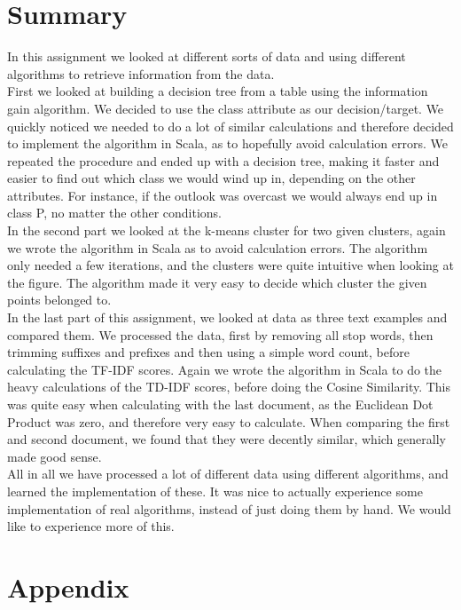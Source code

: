 \documentclass{article}
\theoremstyle{remark}
\begin{document}
	\section{Summary}
	In this assignment we looked at different sorts of data and using different algorithms to retrieve information from the data. \\
	First we looked at building a decision tree from a table using the information gain algorithm. We decided to use the class attribute as our decision/target. We quickly noticed we needed to do a lot of similar calculations and therefore decided to implement the algorithm in Scala, as to hopefully avoid calculation errors. We repeated the procedure and ended up with a decision tree, making it faster and easier to find out which class we would wind up in, depending on the other attributes. For instance, if the outlook was overcast we would always end up in class P, no matter the other conditions. \\
	In the second part we looked at the k-means cluster for two given clusters, again we wrote the algorithm in Scala as to avoid calculation errors. The algorithm only needed a few iterations, and the clusters were quite intuitive when looking at the figure. The algorithm made it very easy to decide which cluster the given points belonged to. \\
	In the last part of this assignment, we looked at data as three text examples and compared them. We processed the data, first by removing all stop words, then trimming suffixes and prefixes and then using a simple word count, before calculating the TF-IDF scores. Again we wrote the algorithm in Scala to do the heavy calculations of the TD-IDF scores, before doing the Cosine Similarity. This was quite easy when calculating with the last document, as the Euclidean Dot Product was zero, and therefore very easy to calculate. When comparing the first and second document, we found that they were decently similar, which generally made good sense. \\
	All in all we have processed a lot of different data using different algorithms, and learned the implementation of these. It was nice to actually experience some implementation of real algorithms, instead of just doing them by hand. We would like to experience more of this. 
	\newpage\section{Appendix}
\end{document}
